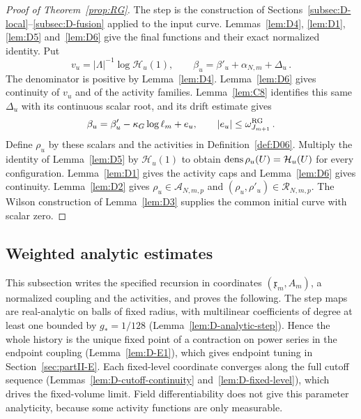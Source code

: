 \begin{proof}[Proof of Theorem~\ref{prop:RG}]
The step is the construction of Sections~\ref{subsec:D-local}--\ref{subsec:D-fusion} applied to the input curve. Lemmas~\ref{lem:D4}, \ref{lem:D1}, \ref{lem:D5} and~\ref{lem:D6} give the final functions and their exact normalized identity. Put
\begin{equation*}
v_u=|\Lambda|^{-1}\log\mathcal H_u(1),\qquad
\beta_u=\beta'_u+\alpha_{N,m}+\Delta_u\,.
\end{equation*}
The denominator is positive by Lemma~\ref{lem:D4}. Lemma~\ref{lem:D6} gives continuity of $v_u$ and of the activity families. Lemma~\ref{lem:C8} identifies this same $\Delta_u$ with its continuous scalar root, and its drift estimate gives
\begin{equation*}
\beta_u=\beta'_u-\kappa_G\log\ell_m+e_u,\qquad
|e_u|\le\omega_{J_{m+1}}^{\rm RG}\,.
\end{equation*}
Define $\rho_u$ by these scalars and the activities in Definition~\ref{def:D06}. Multiply the identity of Lemma~\ref{lem:D5} by $\mathcal H_u(1)$ to obtain $\operatorname{dens}\rho_u(U)=\mathcal H_u(U)$ for every configuration. Lemma~\ref{lem:D1} gives the activity caps and Lemma~\ref{lem:D6} gives continuity. Lemma~\ref{lem:D2} gives $\rho_u\in\mathcal A_{N,m,p}$ and $(\rho_u,\rho'_u)\in\mathcal R_{N,m,p}$. The Wilson construction of Lemma~\ref{lem:D3} supplies the common initial curve with scalar zero.
\end{proof}

\subsection{Weighted analytic estimates}\label{subsec:D-analytic}

This subsection writes the specified recursion in coordinates $(\mathfrak x_m,A_m)$, a normalized coupling and the activities, and proves the following. The step maps are real-analytic on balls of fixed radius, with multilinear coefficients of degree at least one bounded by $g_*=1/128$ (Lemma~\ref{lem:D-analytic-step}). Hence the whole history is the unique fixed point of a contraction on power series in the endpoint coupling (Lemma~\ref{lem:D-E1}), which gives endpoint tuning in Section~\ref{sec:partII-E}. Each fixed-level coordinate converges along the full cutoff sequence (Lemmas~\ref{lem:D-cutoff-continuity} and~\ref{lem:D-fixed-level}), which drives the fixed-volume limit. Field differentiability does not give this parameter analyticity, because some activity functions are only measurable.

